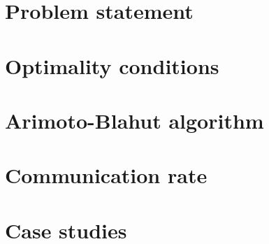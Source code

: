 \documentclass[letterpaper, 10 pt, conference]{ieeeconf}  %
\begin{document}
 






\section{Problem statement}








\section{Optimality conditions}



\section{Arimoto-Blahut algorithm}


\section{Communication rate}



\section{Case studies}







\end{document}
